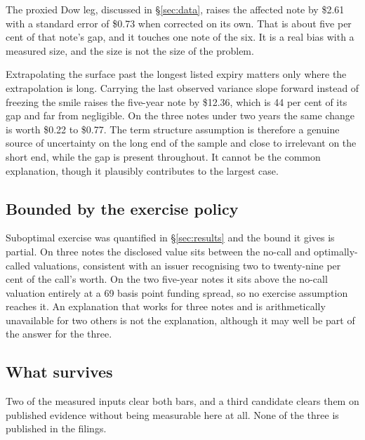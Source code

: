 The proxied Dow leg, discussed in \S\ref{sec:data}, raises the affected note by
\$2.61 with a standard error of \$0.73 when corrected on its own. That is about
five per cent of that note's gap, and it touches one note of the six. It is a
real bias with a measured size, and the size is not the size of the problem.

Extrapolating the surface past the longest listed expiry matters only where the
extrapolation is long. Carrying the last observed variance slope forward
instead of freezing the smile raises the five-year note by \$12.36, which is 44
per cent of its gap and far from negligible. On the three notes under two years
the same change is worth \$0.22 to \$0.77. The term structure assumption is
therefore a genuine source of uncertainty on the long end of the sample and
close to irrelevant on the short end, while the gap is present throughout. It
cannot be the common explanation, though it plausibly contributes to the
largest case.

\subsection{Bounded by the exercise policy}

Suboptimal exercise was quantified in \S\ref{sec:results} and the bound it
gives is partial. On three notes the disclosed value sits between the
no-call and optimally-called valuations, consistent with an issuer recognising
two to twenty-nine per cent of the call's worth. On the two five-year notes it
sits above the no-call valuation entirely at a 69 basis point funding spread,
so no exercise assumption reaches it. An explanation that works for three notes
and is arithmetically unavailable for two others is not the explanation,
although it may well be part of the answer for the three.

\subsection{What survives}

Two of the measured inputs clear both bars, and a third candidate clears them
on published evidence without being measurable here at all. None of the three
is published in the filings.

